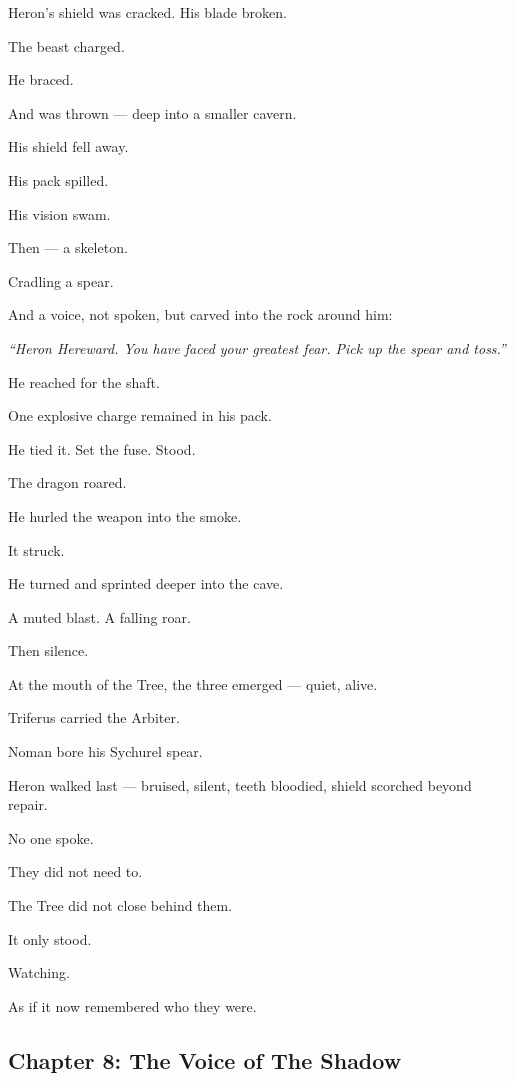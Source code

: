 \documentclass[12pt]{article}
\begin{document}
Heron’s shield was cracked. His blade broken.

The beast charged.

He braced.

And was thrown — deep into a smaller cavern.

His shield fell away.

His pack spilled.

His vision swam.

Then — a skeleton.

Cradling a spear.

And a voice, not spoken, but carved into the rock around him:

\textit{“Heron Hereward. You have faced your greatest fear. Pick up the spear and toss.”}

He reached for the shaft.

One explosive charge remained in his pack.

He tied it. Set the fuse. Stood.

The dragon roared.

He hurled the weapon into the smoke.

It struck.

He turned and sprinted deeper into the cave.

A muted blast. A falling roar.

Then silence.

\bigskip

At the mouth of the Tree, the three emerged — quiet, alive.

Triferus carried the Arbiter.

Noman bore his Sychurel spear.

Heron walked last — bruised, silent, teeth bloodied, shield scorched beyond repair.

No one spoke.

They did not need to.

The Tree did not close behind them.

It only stood.

Watching.

As if it now remembered who they were.


\newpage

\subsection*{Chapter 8: The Voice of The Shadow}

\vspace{.5in}
\end{document}
